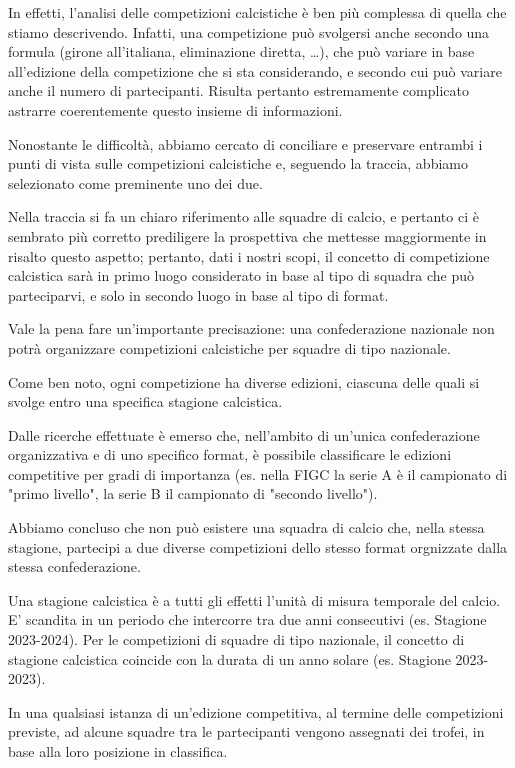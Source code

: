 In effetti, l'analisi delle competizioni calcistiche è ben più complessa di quella che stiamo descrivendo. Infatti, una competizione può svolgersi anche secondo una formula (girone all'italiana, eliminazione diretta, \dots),
che può variare in base all'edizione della competizione che si sta considerando,
e secondo cui può variare anche il numero di partecipanti. Risulta pertanto estremamente complicato astrarre coerentemente questo insieme di informazioni.

Nonostante le difficoltà, abbiamo cercato di conciliare e preservare entrambi i punti di vista sulle
competizioni calcistiche e, seguendo la traccia, abbiamo selezionato come preminente uno
dei due.

Nella traccia si fa un chiaro riferimento alle squadre di calcio, e pertanto ci è sembrato
più corretto prediligere la prospettiva che mettesse maggiormente in risalto questo aspetto;
pertanto, dati i nostri scopi, il concetto di competizione calcistica sarà in primo luogo
considerato in base al tipo di squadra che può parteciparvi, e solo in secondo luogo
in base al tipo di format.

Vale la pena fare un'importante precisazione: una confederazione nazionale non potrà organizzare competizioni
calcistiche per squadre di tipo nazionale.

\bigskip
\bigskip

Come ben noto, ogni competizione ha diverse edizioni, ciascuna delle quali si svolge entro
una specifica stagione calcistica.

Dalle ricerche effettuate è emerso che, nell'ambito di un'unica confederazione organizzativa e di uno specifico format, è possibile classificare le edizioni competitive per gradi di importanza (es. nella FIGC la serie A è il campionato di "primo
livello", la serie B il campionato di "secondo livello").

Abbiamo concluso che non può esistere una squadra di calcio che, nella
stessa stagione, partecipi a due diverse competizioni dello stesso format orgnizzate dalla stessa
confederazione.

Una stagione calcistica è a tutti gli effetti l'unità di misura temporale del calcio. E' scandita in un periodo che intercorre tra due anni consecutivi (es. Stagione 2023-2024).
Per le competizioni di squadre di tipo nazionale, il concetto di stagione calcistica
coincide con la durata di un anno solare (es. Stagione 2023-2023).

In una qualsiasi istanza di un'edizione competitiva, al termine delle competizioni previste, ad alcune squadre tra le partecipanti vengono assegnati dei trofei, in base alla loro posizione in classifica.

